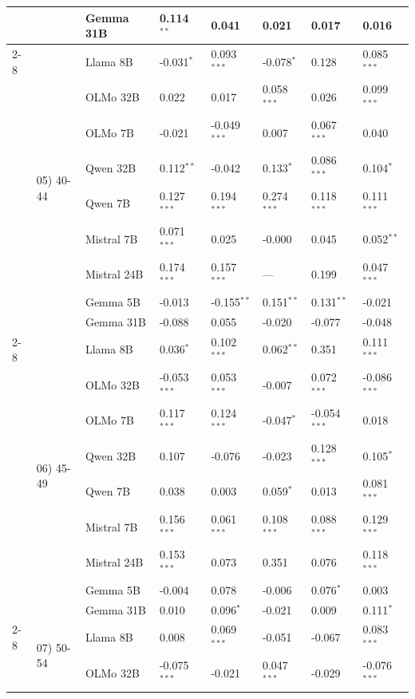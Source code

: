\begin{longtable}[t]{llllllll}
 &  & Gemma 31B & 0.114$^{**}$ & 0.041 & 0.021 & 0.017 & 0.016 \\
\cline{2-8}
 & \multirow[t]{9}{*}{05) 40-44} & Llama 8B & -0.031$^{*}$ & 0.093$^{***}$ & -0.078$^{*}$ & 0.128 & 0.085$^{***}$ \\
 &  & OLMo 32B & 0.022 & 0.017 & 0.058$^{***}$ & 0.026 & 0.099$^{***}$ \\
 &  & OLMo 7B & -0.021 & -0.049$^{***}$ & 0.007 & 0.067$^{***}$ & 0.040 \\
 &  & Qwen 32B & 0.112$^{**}$ & -0.042 & 0.133$^{*}$ & 0.086$^{***}$ & 0.104$^{*}$ \\
 &  & Qwen 7B & 0.127$^{***}$ & 0.194$^{***}$ & 0.274$^{***}$ & 0.118$^{***}$ & 0.111$^{***}$ \\
 &  & Mistral 7B & 0.071$^{***}$ & 0.025 & -0.000 & 0.045 & 0.052$^{**}$ \\
 &  & Mistral 24B & 0.174$^{***}$ & 0.157$^{***}$ & --- & 0.199 & 0.047$^{***}$ \\
 &  & Gemma 5B & -0.013 & -0.155$^{**}$ & 0.151$^{**}$ & 0.131$^{**}$ & -0.021 \\
 &  & Gemma 31B & -0.088 & 0.055 & -0.020 & -0.077 & -0.048 \\
\cline{2-8}
 & \multirow[t]{9}{*}{06) 45-49} & Llama 8B & 0.036$^{*}$ & 0.102$^{***}$ & 0.062$^{**}$ & 0.351 & 0.111$^{***}$ \\
 &  & OLMo 32B & -0.053$^{***}$ & 0.053$^{***}$ & -0.007 & 0.072$^{***}$ & -0.086$^{***}$ \\
 &  & OLMo 7B & 0.117$^{***}$ & 0.124$^{***}$ & -0.047$^{*}$ & -0.054$^{***}$ & 0.018 \\
 &  & Qwen 32B & 0.107 & -0.076 & -0.023 & 0.128$^{***}$ & 0.105$^{*}$ \\
 &  & Qwen 7B & 0.038 & 0.003 & 0.059$^{*}$ & 0.013 & 0.081$^{***}$ \\
 &  & Mistral 7B & 0.156$^{***}$ & 0.061$^{***}$ & 0.108$^{***}$ & 0.088$^{***}$ & 0.129$^{***}$ \\
 &  & Mistral 24B & 0.153$^{***}$ & 0.073 & 0.351 & 0.076 & 0.118$^{***}$ \\
 &  & Gemma 5B & -0.004 & 0.078 & -0.006 & 0.076$^{*}$ & 0.003 \\
 &  & Gemma 31B & 0.010 & 0.096$^{*}$ & -0.021 & 0.009 & 0.111$^{*}$ \\
\cline{2-8}
 & \multirow[t]{9}{*}{07) 50-54} & Llama 8B & 0.008 & 0.069$^{***}$ & -0.051 & -0.067 & 0.083$^{***}$ \\
 &  & OLMo 32B & -0.075$^{***}$ & -0.021 & 0.047$^{***}$ & -0.029 & -0.076$^{***}$ \\

\end{longtable}

